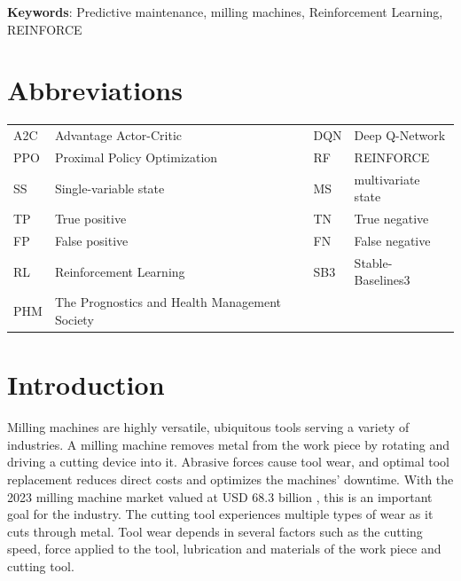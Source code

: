 \documentclass[a4paper, 12pt]{article}
\newcommand{\rowspace}[1]{\renewcommand{\arraystretch}{#1}}
\begin{document}
\noindent \textbf{Keywords}: Predictive maintenance, milling machines, Reinforcement Learning, REINFORCE

\section*{Abbreviations}

\begin{table}[!htbp]\centering
	\sffamily
	\rowspace{1.3}
	\begin{tabular}{L{1cm} L{4.5cm} L{1cm} L{4.5cm}}
		\toprule	
		
		A2C & Advantage Actor-Critic & DQN & Deep Q-Network\\
		PPO & Proximal Policy Optimization & RF & REINFORCE\\
		SS & Single-variable state & MS & multivariate state\\
		TP &True positive &TN &True negative\\
		FP &False positive &FN &False negative\\
		RL & Reinforcement Learning & SB3 & Stable-Baselines3\\
		PHM & The Prognostics and Health Management Society & & \\

		\bottomrule
	\end{tabular}
	\label{tbl:abbrev}
\end{table}

\newpage
\thispagestyle{empty}
{}
\section{Introduction}


Milling machines are highly versatile, ubiquitous tools serving a variety of industries. A milling machine removes metal from the work piece by rotating and driving a cutting device into it. Abrasive forces cause tool wear, and optimal tool replacement reduces direct costs and optimizes the machines' downtime. With the 2023 milling machine market valued at USD 68.3 billion \citep{milling-market}, this is an important goal for the industry. The cutting tool experiences multiple types of wear as it cuts through metal. Tool wear depends in several factors such as the cutting speed, force applied to the tool, lubrication and materials of the work piece and cutting tool. 
\end{document}

